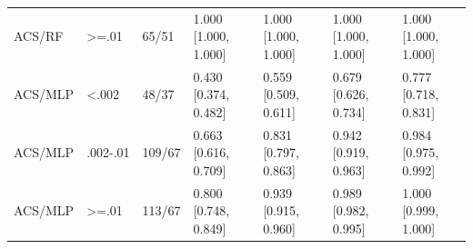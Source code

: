 \begin{tabular}{lllllll}
ACS/RF & >=.01 & 65/51 & 1.000 [1.000, 1.000] & 1.000 [1.000, 1.000] & 1.000 [1.000, 1.000] & 1.000 [1.000, 1.000] \\
ACS/MLP & <.002 & 48/37 & 0.430 [0.374, 0.482] & 0.559 [0.509, 0.611] & 0.679 [0.626, 0.734] & 0.777 [0.718, 0.831] \\
ACS/MLP & .002-.01 & 109/67 & 0.663 [0.616, 0.709] & 0.831 [0.797, 0.863] & 0.942 [0.919, 0.963] & 0.984 [0.975, 0.992] \\
ACS/MLP & >=.01 & 113/67 & 0.800 [0.748, 0.849] & 0.939 [0.915, 0.960] & 0.989 [0.982, 0.995] & 1.000 [0.999, 1.000] \\
\bottomrule
\end{tabular}
\endgroup
